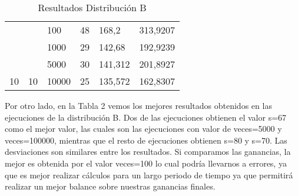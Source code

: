 \documentclass{article}
\begin{document}
\begin{table}[h]
\begin{tabular}{llllll}
		\multicolumn{1}{|l|}{}                                                 & \multicolumn{1}{l|}{}                                                 & \multicolumn{1}{l|}{100}                                                  & \multicolumn{1}{l|}{48}                                                      & \multicolumn{1}{l|}{168,2}                                                          & \multicolumn{1}{l|}{313,9207}                                                         \\ \cline{3-6} 
		\multicolumn{1}{|l|}{}                                                 & \multicolumn{1}{l|}{}                                                 & \multicolumn{1}{l|}{1000}                                                 & \multicolumn{1}{l|}{29}                                                      & \multicolumn{1}{l|}{142,68}                                                         & \multicolumn{1}{l|}{192,9239}                                                         \\ \cline{3-6} 
		\multicolumn{1}{|l|}{}                                                 & \multicolumn{1}{l|}{}                                                 & \multicolumn{1}{l|}{5000}                                                 & \multicolumn{1}{l|}{30}                                                      & \multicolumn{1}{l|}{141,312}                                                        & \multicolumn{1}{l|}{201,8927}                                                         \\ \cline{3-6} 
		\multicolumn{1}{|l|}{\multirow{-4}{*}{10}}                             & \multicolumn{1}{l|}{\multirow{-4}{*}{10}}                             & \multicolumn{1}{l|}{10000}                                                & \multicolumn{1}{l|}{25}                                                      & \multicolumn{1}{l|}{135,572}                                                        & \multicolumn{1}{l|}{162,8307}                                                         \\ \hline
	\end{tabular}
	\caption{Resultados Distribución B}
\end{table}

\newpage
	
Por otro lado, en la Tabla 2 vemos los mejores resultados obtenidos en las ejecuciones de la distribución B. Dos de las ejecuciones obtienen el valor s=67 como el mejor valor, las cuales son las ejecuciones con valor de veces=5000 y veces=100000, mientras que el resto de ejecuciones obtienen s=80 y s=70. Las desviaciones son similares entre los resultados. Si comparamos las ganancias, la mejor es obtenida por el valor veces=100 lo cual podría llevarnos a errores, ya que es mejor realizar cálculos para un largo periodo de tiempo ya que permitirá realizar un mejor balance sobre nuestras ganancias finales. \\
\end{document}
